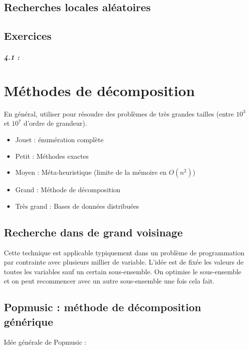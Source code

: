 \documentclass[11pt,a4paper]{report}
\begin{document}
\section{Recherches locales aléatoires}

\section{Exercices}

\paragraph*{4.1 : }

\chapter{Méthodes de décomposition}

En général, utiliser pour résoudre des problèmes de très grandes tailles (entre $10^3$ et $10^7$ d'ordre de grandeur).
\begin{itemize}
    \item Jouet : énumération complète
    \item Petit : Méthodes exactes
    \item Moyen : Méta-heuristique (limite de la mémoire en $O(n^2)$)
    \item Grand : Méthode de décomposition
    \item Très grand : Bases de données distribuées
\end{itemize}

\section{Recherche dans de grand voisinage}

Cette technique est applicable typiquement dans un problème de programmation par contrainte avec plusieurs millier de variable. L'idée est de fixée les valeurs de toutes les variables sauf un certain sous-ensemble. On optimise le sous-ensemble et on peut recommencer avec un autre sous-ensemble une fois cela fait.

\section{Popmusic : méthode de décomposition générique}

Idée générale de Popmusic :

\begin{algorithm}[H]
\end{algorithm}
\end{document}
